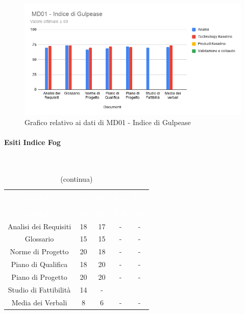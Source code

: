 \begin{figure}[H]
\centering
\includegraphics[scale=0.5]{./img/MD01_gulpease.png}
\caption{Grafico relativo ai dati di MD01 - Indice di Gulpease}
\end{figure}

\paragraph{Esiti Indice Fog} \mbox{} \\
\begin{longtable}{c c c c c}
\rowcolor{white}\caption{Tabella Indice Fog} \\
		\rowcolor{redafk}
\textcolor{white}{\textbf{Attività}} &
\textcolor{white}{\textbf{An}} &
\textcolor{white}{\textbf{TB}} &
\textcolor{white}{\textbf{PB}}&
\textcolor{white}{\textbf{VC}}  \\
		\endfirsthead
		\rowcolor{white}\caption[]{(continua)} \\
		\rowcolor{redafk}
\textcolor{white}{\textbf{Attività}} &
\textcolor{white}{\textbf{An}} &
\textcolor{white}{\textbf{TB}} &
\textcolor{white}{\textbf{PB}}&
\textcolor{white}{\textbf{VC}}  \\
		\endhead
Analisi dei Requisiti & 18 & 17 & - & - \\
Glossario & 15 & 15 & - & - \\
Norme di Progetto & 20 & 18 & - & - \\
Piano di Qualifica & 18 & 20 & - & - \\
Piano di Progetto & 20 & 20 & - & - \\
Studio di Fattibilità & 14 & - & & \\
Media dei Verbali & 8 & 6 & - & - \\
\end{longtable}

